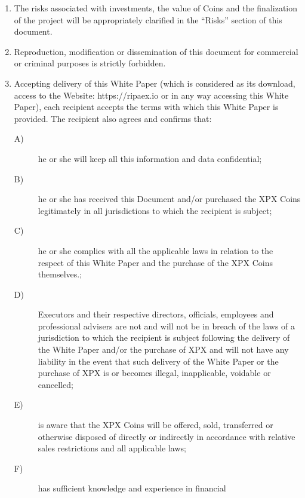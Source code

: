 \documentclass[11pt,fleqn]{book} %
\begin{document}
\begin{scriptsize}
{\begin{enumerate}
			which have been written using as an example the
			laws governing the publication of texts and documents in
			Europe at the time of publication. Such documents may
			not be approved or comply with the laws of INVESTORS’
			states, in which case a lawyer should be consulted for
			further information regarding the structured rules of this
			TEC and the international laws to which it will be submitted
			once it is launched.
			\item The risks associated with investments, the value of Coins
			and the finalization of the project will be appropriately
			clarified in the ``Risks'' section of this document.
			\item Reproduction, modification or dissemination of this
			document for commercial or criminal purposes is strictly
			forbidden.
			\item Accepting delivery of this White Paper (which is considered
			as its download, access to the Website: https://ripaex.io or 
			in any way accessing this White Paper), each recipient
			accepts the terms with which this White Paper is provided.
			The recipient also agrees and confirms that:
			\begin{description}
				\item[A)] he or she will keep all this information and data confidential;
				\item[B)] he or she has received this Document and/or purchased
				the XPX Coins legitimately in all jurisdictions to
				which the recipient is subject;
				\item[C)] he or she complies with all the applicable laws in relation
				to the respect of this White Paper and the purchase
				of the XPX Coins themselves.;
				\item[D)] Executors and their respective directors, officials,
				employees and professional advisers are not and will
				not be in breach of the laws of a jurisdiction to which the
				recipient is subject following the delivery of the White
				Paper and/or the purchase of XPX and will not have any
				liability in the event that such delivery of the White Paper
				or the purchase of XPX is or becomes illegal, inapplicable,
				voidable or cancelled;
				\item[E)] is aware that the XPX Coins will be offered, sold,
				transferred or otherwise disposed of directly or indirectly
				in accordance with relative sales restrictions and all applicable
				laws;
				\item[F)] has sufficient knowledge and experience in financial

\end{description}
\end{enumerate}}
\end{scriptsize}
\end{document}
